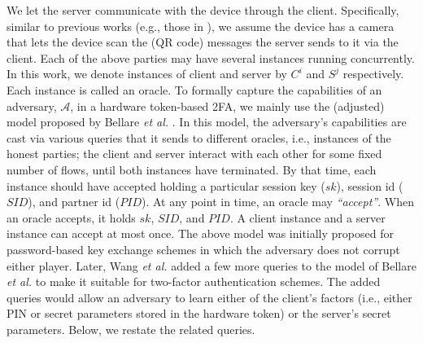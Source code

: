 We let the server communicate with the device through the client. Specifically, similar to previous works (e.g., those in \cite{JareckiJKSS21,Digipass-website,Gemalto}), we assume the device has a camera that lets the device scan the (QR code) messages the server sends to it via the client. Each of the above parties may have several instances running concurrently. In this work, we denote instances of client and server by  $C^{i}$ and  $S^{j}$ respectively. Each instance is called an oracle.  
%
To formally capture the capabilities of an adversary, $\mathcal{A}$, in a hardware token-based 2FA,  we mainly use the (adjusted) model proposed by Bellare \textit{et al.} \cite{BellarePR00}. In this model, the adversary’s capabilities are cast via various queries that it sends to different oracles, i.e., instances of the honest parties; the client and server interact with each other for some fixed number of flows, until both instances have terminated. By that time, each instance should have accepted holding a particular session key ($sk$), session id ($SID$), and partner id ($PID$). At any point in time, an oracle may \emph{``accept''}. When an oracle accepts, it holds $sk$, $SID$, and $PID$. A client instance and a server instance can accept at most once. The above model was initially proposed for password-based key exchange schemes in which the adversary does not corrupt either player.  Later, Wang \textit{et al.} \cite{WangW18}  added a few more queries to the model of  Bellare \textit{et al.} to make it suitable for two-factor authentication schemes. The added queries would allow an adversary to learn either of the client's factors (i.e., either PIN or secret parameters stored in the hardware token) or the server's secret parameters.  Below, we restate the related queries. 
 





